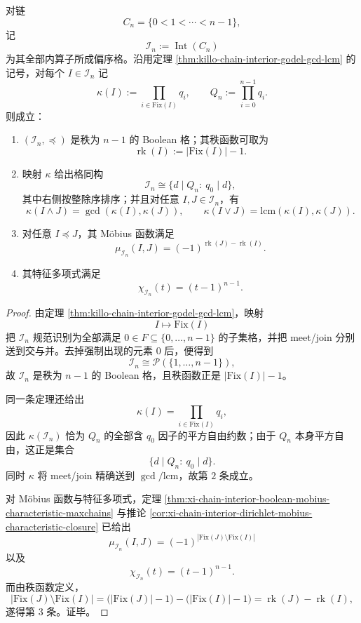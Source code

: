 \begin{theorem}\label{thm:xi-time-part65d-chain-interior-boolean-arithmeticization}
对链
\[
C_n=\{0<1<\cdots<n-1\},
\]
记
\[
\mathcal I_n:=\operatorname{Int}(C_n)
\]
为其全部内算子所成偏序格。沿用定理 \ref{thm:killo-chain-interior-godel-gcd-lcm} 的记号，对每个 \(I\in \mathcal I_n\) 记
\[
\kappa(I):=\prod_{i\in \mathrm{Fix}(I)}q_i,
\qquad
Q_n:=\prod_{i=0}^{n-1}q_i.
\]
则成立：
\begin{enumerate}
  \item \((\mathcal I_n,\preceq)\) 是秩为 \(n-1\) 的 Boolean 格；其秩函数可取为
  \[
  \operatorname{rk}(I):=|\mathrm{Fix}(I)|-1.
  \]
  \item 映射 \(\kappa\) 给出格同构
  \[
  \mathcal I_n
  \cong
  \{d\mid Q_n:\ q_0\mid d\},
  \]
  其中右侧按整除序排序；并且对任意 \(I,J\in \mathcal I_n\)，有
  \[
  \kappa(I\wedge J)=\gcd(\kappa(I),\kappa(J)),
  \qquad
  \kappa(I\vee J)=\mathrm{lcm}(\kappa(I),\kappa(J)).
  \]
  \item 对任意 \(I\preceq J\)，其 Möbius 函数满足
  \[
  \mu_{\mathcal I_n}(I,J)
  =
  (-1)^{\operatorname{rk}(J)-\operatorname{rk}(I)}.
  \]
  \item 其特征多项式满足
  \[
  \chi_{\mathcal I_n}(t)=(t-1)^{n-1}.
  \]
\end{enumerate}
\end{theorem}
\begin{proof}
由定理 \ref{thm:killo-chain-interior-godel-gcd-lcm}，映射
\[
I\longmapsto \mathrm{Fix}(I)
\]
把 \(\mathcal I_n\) 规范识别为全部满足 \(0\in F\subseteq\{0,\dots,n-1\}\) 的子集格，并把 meet/join 分别送到交与并。去掉强制出现的元素 \(0\) 后，便得到
\[
\mathcal I_n\cong \mathcal P(\{1,\dots,n-1\}),
\]
故 \(\mathcal I_n\) 是秩为 \(n-1\) 的 Boolean 格，且秩函数正是
\(
|\mathrm{Fix}(I)|-1
\)。

同一条定理还给出
\[
\kappa(I)=\prod_{i\in \mathrm{Fix}(I)}q_i,
\]
因此 \(\kappa(\mathcal I_n)\) 恰为 \(Q_n\) 的全部含 \(q_0\) 因子的平方自由约数；由于 \(Q_n\) 本身平方自由，这正是集合
\[
\{d\mid Q_n:\ q_0\mid d\}.
\]
同时 \(\kappa\) 将 meet/join 精确送到 \(\gcd/\mathrm{lcm}\)，故第 \(2\) 条成立。

对 Möbius 函数与特征多项式，定理
\ref{thm:xi-chain-interior-boolean-mobius-characteristic-maxchains} 与推论
\ref{cor:xi-chain-interior-dirichlet-mobius-characteristic-closure} 已给出
\[
\mu_{\mathcal I_n}(I,J)=(-1)^{|\mathrm{Fix}(J)\setminus \mathrm{Fix}(I)|}
\]
以及
\[
\chi_{\mathcal I_n}(t)=(t-1)^{n-1}.
\]
而由秩函数定义，
\[
|\mathrm{Fix}(J)\setminus \mathrm{Fix}(I)|
=
\bigl(|\mathrm{Fix}(J)|-1\bigr)-\bigl(|\mathrm{Fix}(I)|-1\bigr)
=
\operatorname{rk}(J)-\operatorname{rk}(I),
\]
遂得第 \(3\) 条。证毕。
\end{proof}


